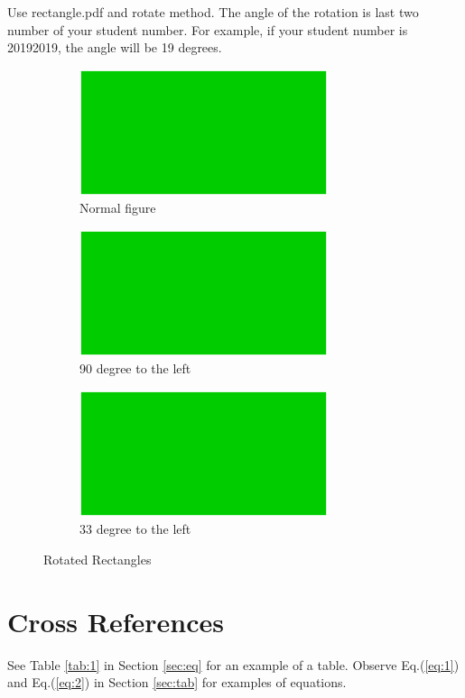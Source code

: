 \documentclass{article}
\begin{document}
		Use rectangle.pdf and rotate method. The angle of the rotation is last two number of your student number. For example, if your student number is 20192019, the angle will be 19 degrees.
		\begin{figure}[tbh]
		\centering
		\begin{subfigure}[tbh]{0.3\textwidth}
			\centering
			\includegraphics[width=0.8\textwidth]{rectangle}
			\caption{Normal figure}
		\end{subfigure}
		\hfill
		\begin{subfigure}[tbh]{0.3\textwidth}
			\centering
			\includegraphics[angle=90, width=0.8\textwidth]{rectangle}
			\caption{90 degree to the left}
		\end{subfigure}
		\hfill
		\begin{subfigure}[tbh]{0.3\textwidth}
			\centering
			\includegraphics[angle=327, width=0.8\textwidth]{rectangle}
			\caption{33 degree to the left}
		\end{subfigure}
	\caption{Rotated Rectangles}
	\end{figure}
		
\section{Cross References}
	See Table \ref{tab:1} in Section \ref{sec:eq} for an example of a table. Observe Eq.(\ref{eq:1}) and Eq.(\ref{eq:2}) in Section \ref{sec:tab} for examples of equations.

\tableofcontents
\listoffigures
\listoftables
\end{document}
